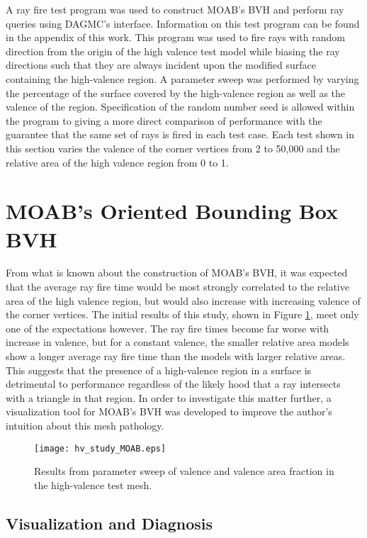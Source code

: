 A ray fire test program was used to construct MOAB's BVH and perform ray queries
using DAGMC's interface. Information on this test program can be found in the
appendix of this work. This program was used to fire rays with random direction
from the origin of the high valence test model while biasing the ray directions
such that they are always incident upon the modified surface containing the
high-valence region. A parameter sweep was performed by varying the percentage
of the surface covered by the high-valence region as well as the valence of the
region. Specification of the random number seed is allowed within the program to
giving a more direct comparison of performance with the guarantee that the same
set of rays is fired in each test case. Each test shown in this section varies
the valence of the corner vertices from 2 to 50,000 and the relative area of the
high valence region from 0 to 1.

\section{MOAB's Oriented Bounding Box BVH}\label{sec:hv_study_MOAB}

From what is known about the construction of MOAB's BVH, it was expected that
the average ray fire time would be most strongly correlated to the relative area
of the high valence region, but would also increase with increasing valence of
the corner vertices. The initial results of this study, shown in Figure
\ref{fig:hv_study_moab}, meet only one of the expectations however. The ray fire
times become far worse with increase in valence, but for a constant valence, the
smaller relative area models show a longer average ray fire time than the models
with larger relative areas. This suggests that the presence of a high-valence
region in a surface is detrimental to performance regardless of the likely hood
that a ray intersects with a triangle in that region. In order to investigate
this matter further, a visualization tool for MOAB's BVH was developed to
improve the author's intuition about this mesh pathology.

\begin{figure}[H]
  \centering
    \texttt{[image: hv\_study\_MOAB.eps]}
    \caption{Results from parameter sweep of valence and valence area fraction
      in the high-valence test mesh.}
    \label{fig:hv_study_moab}
\end{figure}


\subsection{Visualization and Diagnosis}\label{subsec:hv_vis}

